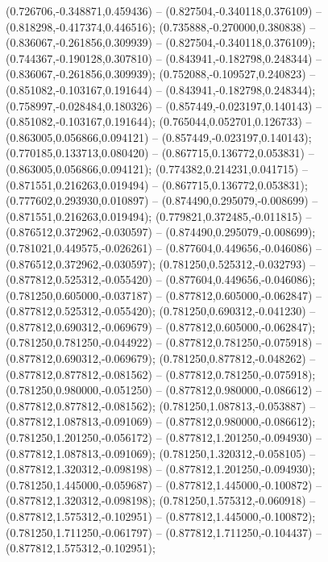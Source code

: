  (0.726706,-0.348871,0.459436) -- (0.827504,-0.340118,0.376109) -- (0.818298,-0.417374,0.446516);
 (0.735888,-0.270000,0.380838) -- (0.836067,-0.261856,0.309939) -- (0.827504,-0.340118,0.376109);
 (0.744367,-0.190128,0.307810) -- (0.843941,-0.182798,0.248344) -- (0.836067,-0.261856,0.309939);
 (0.752088,-0.109527,0.240823) -- (0.851082,-0.103167,0.191644) -- (0.843941,-0.182798,0.248344);
 (0.758997,-0.028484,0.180326) -- (0.857449,-0.023197,0.140143) -- (0.851082,-0.103167,0.191644);
 (0.765044,0.052701,0.126733) -- (0.863005,0.056866,0.094121) -- (0.857449,-0.023197,0.140143);
 (0.770185,0.133713,0.080420) -- (0.867715,0.136772,0.053831) -- (0.863005,0.056866,0.094121);
 (0.774382,0.214231,0.041715) -- (0.871551,0.216263,0.019494) -- (0.867715,0.136772,0.053831);
 (0.777602,0.293930,0.010897) -- (0.874490,0.295079,-0.008699) -- (0.871551,0.216263,0.019494);
 (0.779821,0.372485,-0.011815) -- (0.876512,0.372962,-0.030597) -- (0.874490,0.295079,-0.008699);
 (0.781021,0.449575,-0.026261) -- (0.877604,0.449656,-0.046086) -- (0.876512,0.372962,-0.030597);
 (0.781250,0.525312,-0.032793) -- (0.877812,0.525312,-0.055420) -- (0.877604,0.449656,-0.046086);
 (0.781250,0.605000,-0.037187) -- (0.877812,0.605000,-0.062847) -- (0.877812,0.525312,-0.055420);
 (0.781250,0.690312,-0.041230) -- (0.877812,0.690312,-0.069679) -- (0.877812,0.605000,-0.062847);
 (0.781250,0.781250,-0.044922) -- (0.877812,0.781250,-0.075918) -- (0.877812,0.690312,-0.069679);
 (0.781250,0.877812,-0.048262) -- (0.877812,0.877812,-0.081562) -- (0.877812,0.781250,-0.075918);
 (0.781250,0.980000,-0.051250) -- (0.877812,0.980000,-0.086612) -- (0.877812,0.877812,-0.081562);
 (0.781250,1.087813,-0.053887) -- (0.877812,1.087813,-0.091069) -- (0.877812,0.980000,-0.086612);
 (0.781250,1.201250,-0.056172) -- (0.877812,1.201250,-0.094930) -- (0.877812,1.087813,-0.091069);
 (0.781250,1.320312,-0.058105) -- (0.877812,1.320312,-0.098198) -- (0.877812,1.201250,-0.094930);
 (0.781250,1.445000,-0.059687) -- (0.877812,1.445000,-0.100872) -- (0.877812,1.320312,-0.098198);
 (0.781250,1.575312,-0.060918) -- (0.877812,1.575312,-0.102951) -- (0.877812,1.445000,-0.100872);
 (0.781250,1.711250,-0.061797) -- (0.877812,1.711250,-0.104437) -- (0.877812,1.575312,-0.102951);
